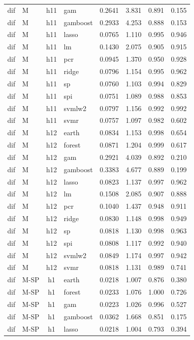 \begin{ThreePartTable}
\begin{longtable}[t]{llclcccc}
dif & M & h11 & gam & 0.2641 & 3.831 & 0.891 & 0.155\\
dif & M & h11 & gamboost & 0.2933 & 4.253 & 0.888 & 0.153\\
dif & M & h11 & lasso & 0.0765 & 1.110 & 0.995 & 0.946\\
dif & M & h11 & lm & 0.1430 & 2.075 & 0.905 & 0.915\\
dif & M & h11 & pcr & 0.0945 & 1.370 & 0.950 & 0.928\\
dif & M & h11 & ridge & 0.0796 & 1.154 & 0.995 & 0.962\\
dif & M & h11 & sp & 0.0760 & 1.103 & 0.994 & 0.829\\
dif & M & h11 & spi & 0.0751 & 1.089 & 0.988 & 0.853\\
dif & M & h11 & svmlw2 & 0.0797 & 1.156 & 0.992 & 0.992\\
dif & M & h11 & svmr & 0.0757 & 1.097 & 0.982 & 0.602\\
\addlinespace
dif & M & h12 & earth & 0.0834 & 1.153 & 0.998 & 0.654\\
dif & M & h12 & forest & 0.0871 & 1.204 & 0.999 & 0.617\\
dif & M & h12 & gam & 0.2921 & 4.039 & 0.892 & 0.210\\
dif & M & h12 & gamboost & 0.3383 & 4.677 & 0.889 & 0.199\\
dif & M & h12 & lasso & 0.0823 & 1.137 & 0.997 & 0.962\\
dif & M & h12 & lm & 0.1508 & 2.085 & 0.907 & 0.888\\
dif & M & h12 & pcr & 0.1040 & 1.437 & 0.948 & 0.911\\
dif & M & h12 & ridge & 0.0830 & 1.148 & 0.998 & 0.949\\
dif & M & h12 & sp & 0.0818 & 1.130 & 0.998 & 0.963\\
dif & M & h12 & spi & 0.0808 & 1.117 & 0.992 & 0.940\\
dif & M & h12 & svmlw2 & 0.0849 & 1.174 & 0.997 & 0.942\\
dif & M & h12 & svmr & 0.0818 & 1.131 & 0.989 & 0.741\\
\addlinespace
dif & M-SP & h1 & earth & 0.0218 & 1.007 & 0.876 & 0.380\\
dif & M-SP & h1 & forest & 0.0233 & 1.076 & 1.000 & 0.726\\
dif & M-SP & h1 & gam & 0.0223 & 1.026 & 0.996 & 0.527\\
dif & M-SP & h1 & gamboost & 0.0362 & 1.668 & 0.851 & 0.175\\
dif & M-SP & h1 & lasso & 0.0218 & 1.004 & 0.793 & 0.394\\

\end{longtable}
\end{ThreePartTable}
